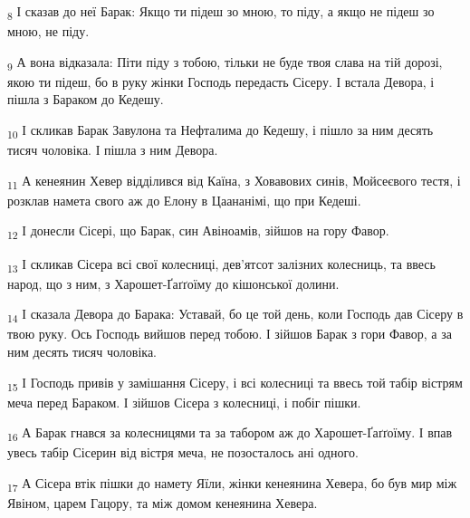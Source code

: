 \begin{tcolorbox}
\textsubscript{8} І сказав до неї Барак: Якщо ти підеш зо мною, то піду, а якщо не підеш зо мною, не піду.
\end{tcolorbox}
\begin{tcolorbox}
\textsubscript{9} А вона відказала: Піти піду з тобою, тільки не буде твоя слава на тій дорозі, якою ти підеш, бо в руку жінки Господь передасть Сісеру. І встала Девора, і пішла з Бараком до Кедешу.
\end{tcolorbox}
\begin{tcolorbox}
\textsubscript{10} І скликав Барак Завулона та Нефталима до Кедешу, і пішло за ним десять тисяч чоловіка. І пішла з ним Девора.
\end{tcolorbox}
\begin{tcolorbox}
\textsubscript{11} А кенеянин Хевер відділився від Каїна, з Ховавових синів, Мойсеєвого тестя, і розклав намета свого аж до Елону в Цаананімі, що при Кедеші.
\end{tcolorbox}
\begin{tcolorbox}
\textsubscript{12} І донесли Сісері, що Барак, син Авіноамів, зійшов на гору Фавор.
\end{tcolorbox}
\begin{tcolorbox}
\textsubscript{13} І скликав Сісера всі свої колесниці, дев'ятсот залізних колесниць, та ввесь народ, що з ним, з Харошет-Ґаґґоїму до кішонської долини.
\end{tcolorbox}
\begin{tcolorbox}
\textsubscript{14} І сказала Девора до Барака: Уставай, бо це той день, коли Господь дав Сісеру в твою руку. Ось Господь вийшов перед тобою. І зійшов Барак з гори Фавор, а за ним десять тисяч чоловіка.
\end{tcolorbox}
\begin{tcolorbox}
\textsubscript{15} І Господь привів у замішання Сісеру, і всі колесниці та ввесь той табір вістрям меча перед Бараком. І зійшов Сісера з колесниці, і побіг пішки.
\end{tcolorbox}
\begin{tcolorbox}
\textsubscript{16} А Барак гнався за колесницями та за табором аж до Харошет-Ґаґґоїму. І впав увесь табір Сісерин від вістря меча, не позосталось ані одного.
\end{tcolorbox}
\begin{tcolorbox}
\textsubscript{17} А Сісера втік пішки до намету Яїли, жінки кенеянина Хевера, бо був мир між Явіном, царем Гацору, та між домом кенеянина Хевера.
\end{tcolorbox}

